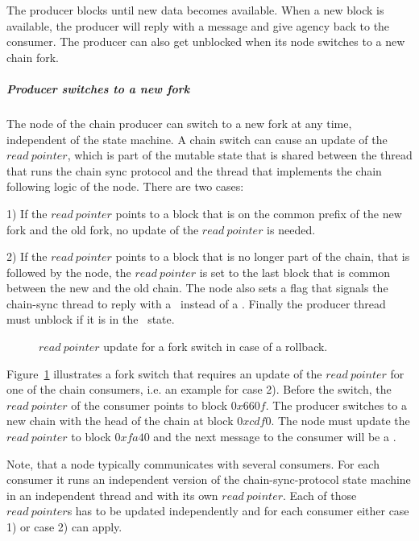 \documentclass{report}
\theoremstyle{definition}{
  \newtheorem{lemma}{Lemma}[section] %
  \newtheorem{definition}[lemma]{Definition}
}
\theoremstyle{theorem}{
  \newtheorem{invariant}[lemma]{Invariant}
  \newtheorem{proofobligation}[lemma]{Proof Obligation}
}
\numberwithin{equation}{lemma}
\begin{document}
The producer blocks until new data becomes available.
When a new block is available, the producer will
reply with a \RollForward{} message and give agency back to the consumer.
The producer can also get unblocked when its node switches to a new chain fork.

\subparagraph{Producer switches to a new fork}
The node of the chain producer can switch to a new fork at any time, independent of the
state machine.
A chain switch can cause an update of the $read~pointer$,
which is part of the mutable state that is shared between the thread that runs
the chain sync protocol and the thread that implements the chain following logic of the node.
There are two cases:

1) If the $read~pointer$ points to a block that is on the common prefix of the new
fork and the old fork, no update of the $read~pointer$ is needed.

2) If the $read~pointer$ points to a block that is no longer part of the chain,
that is followed by the node,
the $read~pointer$ is set to the last block that is common between the new and the old chain.
The node also sets a flag that signals the chain-sync thread to reply with a \RollBackward~instead
of a \RollForward.
Finally the producer thread must unblock if it is in the \MustReply~state.

\begin{figure}[h]
\begin{center}
\end{center}
\caption{$read~pointer$ update for a fork switch in case of a rollback.}
\label{read-pointer-rollback}
\end{figure}

Figure~\ref{read-pointer-rollback} illustrates a fork switch that requires an update of the $read~pointer$
for one of the chain consumers, i.e. an example for case 2).
Before the switch, the $read~pointer$ of the consumer points to block $0x660f$.
The producer switches to a new chain with the head of the chain at block $0xcdf0$.
The node must update the $read~pointer$ to block $0xfa40$ and the next message to the consumer will be a \RollBackward.

Note, that a node typically communicates with several consumers. For each consumer it runs an independent
version of the chain-sync-protocol state machine in an independent thread and with its own $read~pointer$.
Each of those $read~pointer$s has to be updated independently and for each consumer
either case 1) or case 2) can apply.
\end{document}
